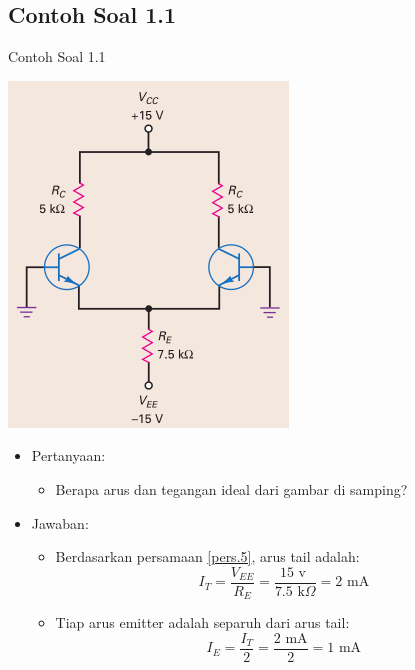 \documentclass[aspectratio=169]{beamer}
\begin{document}
\subsection{Contoh Soal 1.1}
\begin{frame}{Contoh Soal 1.1}
	\begin{multicols}{2}
		\begin{center}
			\includegraphics[width=0.6\textheight]{gambar/01.latihan_soal_1a}
		\end{center}
		\columnbreak
		\begin{itemize}
			\item Pertanyaan:
			\begin{itemize}
				\item Berapa arus dan tegangan ideal dari gambar di samping?
			\end{itemize}
			\item Jawaban:
			\begin{itemize}
				\item Berdasarkan persamaan \ref{pers.5}, arus tail adalah:
				\[I_T = \frac{V_{EE}}{R_E} = \frac{15 \text{ v }}{7.5 \text{ k}\Omega} = 2 \text{ mA} \]
				\item Tiap arus emitter adalah separuh dari arus tail:
				\[ I_E = \frac{I_T}{2} = \frac{2 \text{ mA}}{2} = 1 \text{ mA} \]
			\end{itemize}
		\end{itemize}
		\vfill\null
	\end{multicols}
\end{frame}
\end{document}
